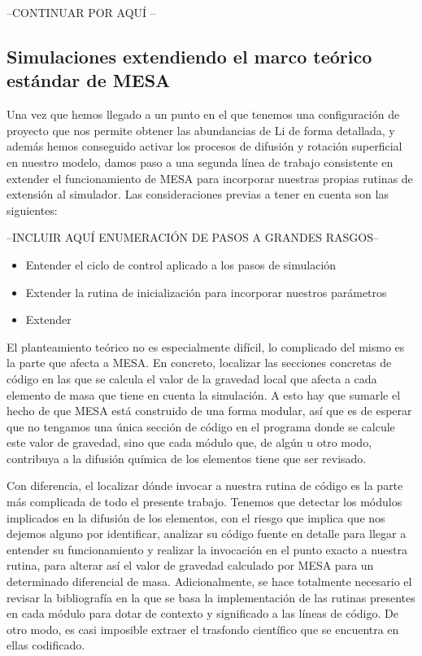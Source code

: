 --CONTINUAR POR AQUÍ --

\subsection{Simulaciones extendiendo el marco teórico estándar de MESA}
Una vez que hemos llegado a un punto en el que tenemos una configuración de proyecto que nos permite obtener las abundancias de Li de forma detallada, y además hemos conseguido activar los procesos de difusión y rotación superficial en nuestro modelo, damos paso a una segunda línea de trabajo consistente en extender el funcionamiento de MESA para incorporar nuestras propias rutinas de extensión al simulador. Las consideraciones previas a tener en cuenta son las siguientes:

--INCLUIR AQUÍ ENUMERACIÓN DE PASOS A GRANDES RASGOS--
\begin{itemize}
    \item Entender el ciclo de control aplicado a los pasos de simulación
    \item Extender la rutina de inicialización para incorporar nuestros parámetros
    \item Extender 
\end{itemize}

El planteamiento teórico no es especialmente difícil, lo complicado del mismo es la parte que afecta a MESA. En concreto, localizar las secciones concretas de código en las que se calcula el valor de la gravedad local que afecta a cada elemento de masa que tiene en cuenta la simulación. A esto hay que sumarle el hecho de que MESA está construido de una forma modular, así que es de esperar que no tengamos una única sección de código en el programa donde se calcule este valor de gravedad, sino que cada módulo que, de algún u otro modo, contribuya a la difusión química de los elementos tiene que ser revisado.\par

Con diferencia, el localizar dónde invocar a nuestra rutina de código es la parte más complicada de todo el presente trabajo. Tenemos que detectar los módulos implicados en la difusión de los elementos, con el riesgo que implica que nos dejemos alguno por identificar, analizar su código fuente en detalle para llegar a entender su funcionamiento y realizar la invocación en el punto exacto a nuestra rutina, para alterar así el valor de gravedad calculado por MESA para un determinado diferencial de masa. Adicionalmente, se hace totalmente necesario el revisar la bibliografía en la que se basa la implementación de las rutinas presentes en cada módulo para dotar de contexto y significado a las líneas de código. De otro modo, es casi imposible extraer el trasfondo científico que se encuentra en ellas codificado.\par

